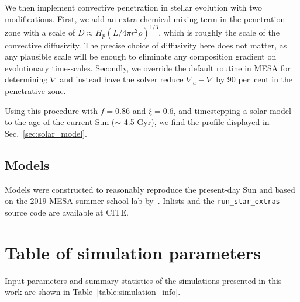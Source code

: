 \documentclass[twocolumn]{aastex631}
\begin{document}
We then implement convective penetration in stellar evolution with two modifications.
First, we add an extra chemical mixing term in the penetration zone with a scale of $D \approx H_p (L/4\pi r^2 \rho)^{1/3}$, which is roughly the scale of the convective diffusivity.
The precise choice of diffusivity here does not matter, as any plausible scale will be enough to eliminate any composition gradient on evolutionary time-scales.
Secondly, we override the default routine in MESA for determining $\nabla$ and instead have the solver reduce $\nabla_a-\nabla$ by 90 per~cent in the penetrative zone.

Using this procedure with $f = 0.86$ and $\xi = 0.6$, and timestepping a solar model to the age of the current Sun ($\sim$ 4.5 Gyr), we find the profile displayed in Sec.~\ref{sec:solar_model}.

\subsection{Models}

Models were constructed to reasonably reproduce the present-day Sun and based on the 2019 MESA summer school lab by~\citet{pm}.
Inlists and the \texttt{run\_star\_extras} source code are available at CITE.

\section{Table of simulation parameters}
\label{app:simulation_table}
Input parameters and summary statistics of the simulations presented in this work are shown in Table~\ref{table:simulation_info}.
\end{document}
